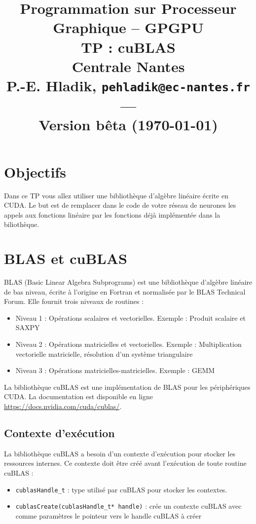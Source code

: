 \documentclass[11pt]{paper}
\title{{\Large Programmation sur Processeur Graphique -- GPGPU }\\
\vspace{-0.4em}
{\large TP : cuBLAS}\\
{\small Centrale Nantes}\\
\small P.-E. Hladik, \small{\texttt{pehladik@ec-nantes.fr}}\\
---\\
{\scriptsize  Version bêta (\today)}\\
}
\begin{document}
\maketitle

  \section{Objectifs}

Dans ce TP vous allez utiliser une bibliothèque d'algèbre linéaire écrite en CUDA. Le but est de remplacer dans le code de votre réseau de neurones les appels aux fonctions linéaire par les fonctions déjà implémentée dans la biliothèque.

  \section{BLAS et cuBLAS}

BLAS (Basic Linear Algebra Subprograms) est une bibliothèque d'algèbre linéaire de bas niveau, écrite à l'origine en Fortran et normalisée par le BLAS Technical Forum. Elle fournit trois niveaux de routines :
\begin{itemize}
	\item  Niveau 1 : Opérations scalaires et vectorielles. Exemple : Produit scalaire et SAXPY
	\item  Niveau 2 : Opérations matricielles et vectorielles. Exemple : Multiplication vectorielle matricielle, résolution d'un système triangulaire
	\item  Niveau 3 : Opérations matricielles-matricielles. Exemple : GEMM
\end{itemize}

La bibliothèque cuBLAS est une implémentation de BLAS pour les périphériques CUDA. La documentation est disponible en ligne \href{https://docs.nvidia.com/cuda/cublas/}{https://docs.nvidia.com/cuda/cublas/}.

  \subsection{Contexte d'exécution}

La bibliothèque cuBLAS a besoin d'un contexte d'exécution pour stocker les ressources internes. Ce contexte doit être créé avant l'exécution de toute routine cuBLAS :
\begin{itemize}
	\item {\tt cublasHandle\_t} : type utilisé par cuBLAS pour stocker les contextes.
	\item {\tt cublasCreate(cublasHandle\_t* handle)} : crée un contexte cuBLAS avec comme paramètres le pointeur vers le handle cuBLAS à créer
\end{itemize}
\end{document}
